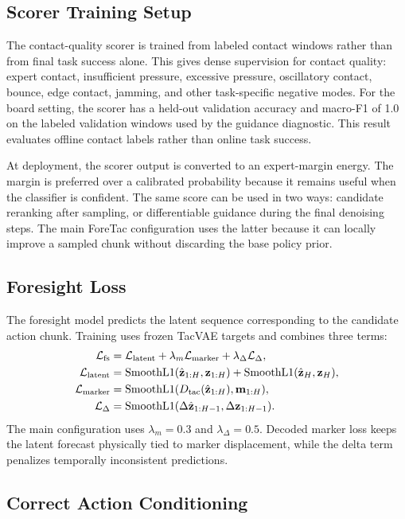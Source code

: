 \documentclass[10pt,letterpaper]{article}
\newcommand{\method}{ForeTac}
\newcommand{\loss}{\mathcal{L}}
\newcommand{\marker}{\mathbf{m}}
\newcommand{\latent}{\mathbf{z}}
\begin{document}
\subsection{Scorer Training Setup}

The contact-quality scorer is trained from labeled contact windows rather than
from final task success alone. This gives dense supervision for contact quality:
expert contact, insufficient pressure, excessive pressure, oscillatory contact,
bounce, edge contact, jamming, and other task-specific negative modes. For the
board setting, the scorer has a held-out validation accuracy and
macro-F1 of 1.0 on the labeled validation windows used by the guidance
diagnostic. This result evaluates offline contact labels rather than online
task success.

At deployment, the scorer output is converted to an expert-margin energy. The
margin is preferred over a calibrated probability because it remains useful
when the classifier is confident. The same score can be used in two ways:
candidate reranking after sampling, or differentiable guidance during the final
denoising steps. The main \method{} configuration uses the latter because it
can locally improve a sampled chunk without discarding the base policy prior.

\subsection{Foresight Loss}

The foresight model predicts the latent sequence corresponding to the candidate
action chunk. Training uses frozen TacVAE targets and combines three terms:
\begin{align}
\loss_{\rm fs}
&= \loss_{\rm latent}
+ \lambda_m \loss_{\rm marker}
+ \lambda_\Delta \loss_\Delta,\\
\loss_{\rm latent}
&= {\rm SmoothL1}(\hat{\latent}_{1:H}, \latent_{1:H})
+ {\rm SmoothL1}(\hat{\latent}_H, \latent_H),\\
\loss_{\rm marker}
&= {\rm SmoothL1}(D_{\rm tac}(\hat{\latent}_{1:H}), \marker_{1:H}),\\
\loss_\Delta
&= {\rm SmoothL1}(\Delta\hat{\latent}_{1:H-1},
\Delta\latent_{1:H-1}).
\end{align}
The main configuration uses $\lambda_m=0.3$ and $\lambda_\Delta=0.5$. Decoded
marker loss keeps the latent forecast physically tied to marker displacement,
while the delta term penalizes temporally inconsistent predictions.

\subsection{Correct Action Conditioning}
\end{document}
